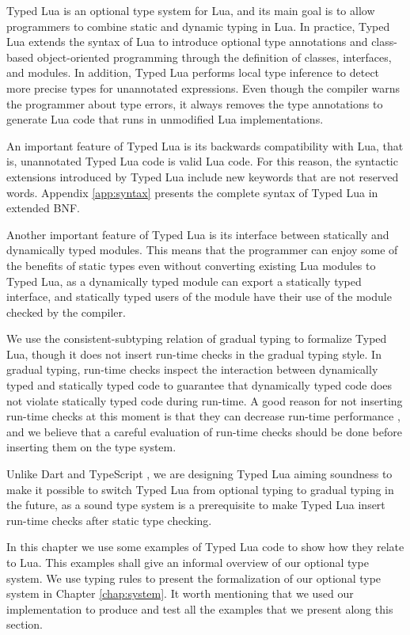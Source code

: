 Typed Lua is an optional type system for Lua, and its main goal is to
allow programmers to combine static and dynamic typing in Lua.
In practice, Typed Lua extends the syntax of Lua to introduce
optional type annotations and class-based object-oriented
programming through the definition of classes, interfaces, and
modules.
In addition, Typed Lua performs local type inference \citep{pierce2000lti}
to detect more precise types for unannotated expressions.
Even though the compiler warns the programmer about type errors,
it always removes the type annotations to generate Lua code that
runs in unmodified Lua implementations.

An important feature of Typed Lua is its backwards compatibility with Lua,
that is, unannotated Typed Lua code is valid Lua code.
For this reason, the syntactic extensions introduced by Typed Lua
include new keywords that are not reserved words.
Appendix \ref{app:syntax} presents the complete syntax of Typed Lua
in extended BNF.

Another important feature of Typed Lua is its interface between
statically and dynamically typed modules.
This means that the programmer can enjoy some of the benefits of
static types even without converting existing Lua modules to Typed Lua,
as a dynamically typed module can export a statically typed interface,
and statically typed users of the module have their use of the module
checked by the compiler.

We use the consistent-subtyping relation of gradual typing
\citep{siek2007objects,siek2013mutable} to formalize Typed Lua,
though it does not insert run-time checks in the gradual typing style.
In gradual typing, run-time checks inspect the interaction between
dynamically typed and statically typed code to guarantee that dynamically
typed code does not violate statically typed code during run-time.
A good reason for not inserting run-time checks at this moment is that they
can decrease run-time performance \citep{allende2013cis}, and we believe that
a careful evaluation of run-time checks should be done before inserting them
on the type system.

Unlike Dart \citep{dart} and TypeScript \citep{typescript},
we are designing Typed Lua aiming soundness to make it possible to switch
Typed Lua from optional typing to gradual typing in the future,
as a sound type system is a prerequisite to make Typed Lua insert
run-time checks after static type checking.

In this chapter we use some examples of Typed Lua code to show how
they relate to Lua.
This examples shall give an informal overview of our optional type system.
We use typing rules to present the formalization of our optional type system
in Chapter \ref{chap:system}.
It worth mentioning that we used our implementation to produce and
test all the examples that we present along this section.

